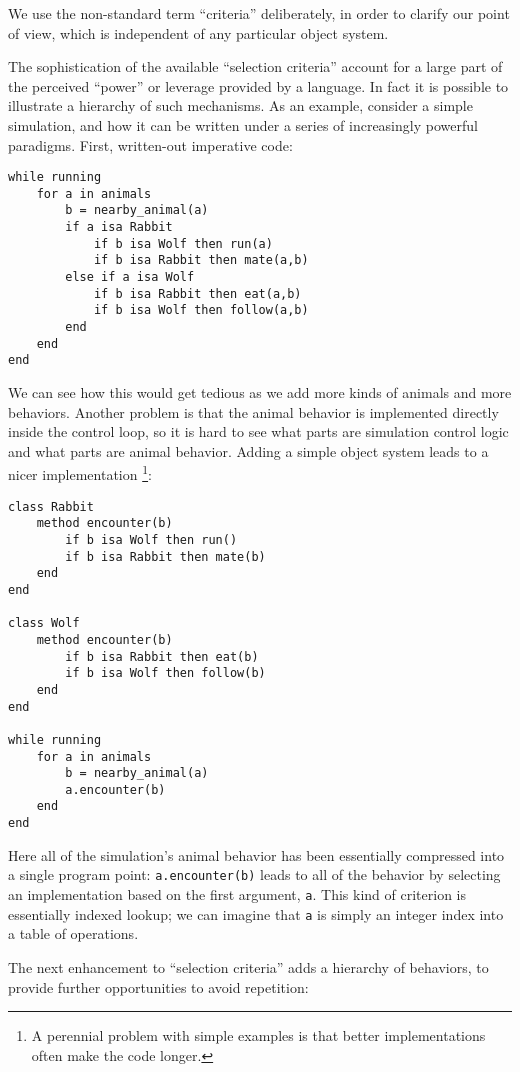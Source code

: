 We use the non-standard term ``criteria'' deliberately, in order
to clarify our point of view, which is independent of any particular
object system.

The sophistication of the available ``selection criteria'' account for a
large part of the perceived ``power'' or leverage provided by a language.
In fact it is possible to illustrate a hierarchy of such mechanisms.
As an example, consider a simple simulation, and how it can be written
under a series of increasingly powerful paradigms. First, written-out
imperative code:

\begin{verbatim}
while running
    for a in animals
        b = nearby_animal(a)
        if a isa Rabbit
            if b isa Wolf then run(a)
            if b isa Rabbit then mate(a,b)
        else if a isa Wolf
            if b isa Rabbit then eat(a,b)
            if b isa Wolf then follow(a,b)
        end
    end
end
\end{verbatim}

We can see how this would get tedious as we add more kinds of animals
and more behaviors. Another problem is that the animal behavior is
implemented directly inside the control loop, so it is hard to see
what parts are simulation control logic and what parts are animal
behavior. Adding a simple object system leads to a nicer implementation
\footnote{A perennial problem with simple examples is that better
implementations often make the code longer.}:

\begin{verbatim}
class Rabbit
    method encounter(b)
        if b isa Wolf then run()
        if b isa Rabbit then mate(b)
    end
end

class Wolf
    method encounter(b)
        if b isa Rabbit then eat(b)
        if b isa Wolf then follow(b)
    end
end

while running
    for a in animals
        b = nearby_animal(a)
        a.encounter(b)
    end
end
\end{verbatim}

Here all of the simulation's animal behavior has been essentially
compressed into a single program point: \texttt{a.encounter(b)}
leads to all of the behavior by selecting an implementation based
on the first argument, \texttt{a}. This kind of criterion is
essentially indexed lookup; we can imagine that \texttt{a} is
simply an integer index into a table of operations.

The next enhancement to ``selection criteria'' adds a hierarchy
of behaviors, to provide further opportunities to avoid
repetition:

